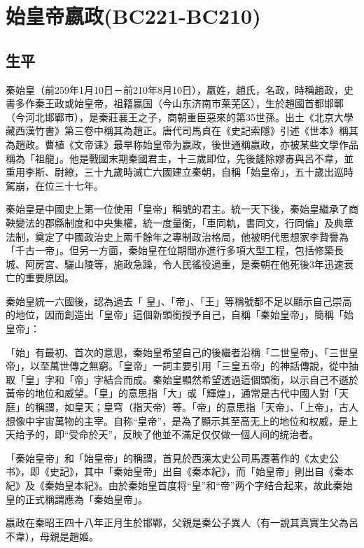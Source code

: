 
\section{始皇帝嬴政\tiny(BC221-BC210)}

\subsection{生平}


秦始皇（前259年1月10日－前210年8月10日），嬴姓，趙氏，名政，時稱趙政，史書多作秦王政或始皇帝，祖籍嬴国（今山东济南市莱芜区），生於趙國首都邯鄲（今河北邯鄲市），是秦莊襄王之子，商朝重臣惡來的第35世孫。出土《北京大學藏西漢竹書》第三卷中稱其為趙正。唐代司馬貞在《史記索隱》引述《世本》稱其為趙政。曹植《文帝诔》最早称始皇帝为嬴政，後世通稱嬴政，亦被某些文學作品稱為「祖龍」。他是戰國末期秦國君主，十三歲即位，先後鏟除嫪毐與呂不韋，並重用李斯、尉繚，三十九歲時滅亡六國建立秦朝，自稱「始皇帝」，五十歲出巡時駕崩，在位三十七年。

秦始皇是中國史上第一位使用「皇帝」稱號的君主。統一天下後，秦始皇繼承了商鞅變法的郡縣制度和中央集權，統一度量衡，「車同軌，書同文，行同倫」及典章法制，奠定了中國政治史上兩千餘年之專制政治格局，他被明代思想家李贄譽為「千古一帝」。但另一方面，秦始皇在位期間亦進行多項大型工程，包括修築長城、阿房宮、驪山陵等，施政急躁，令人民徭役過重，是秦朝在他死後3年迅速衰亡的重要原因。

秦始皇統一六國後，認為過去「 皇」、「帝」、「王」等稱號都不足以顯示自己崇高的地位，因而創造出「皇帝」這個新頭銜授予自己，自稱「秦始皇帝」，簡稱「始皇帝」：

「始」有最初、首次的意思，秦始皇希望自己的後繼者沿稱「二世皇帝」、「三世皇帝」，以至萬世傳之無窮。「皇帝」一詞主要引用「三皇五帝」的神話傳說，從中抽取「皇」字和「帝」字結合而成。秦始皇顯然希望透過這個頭銜，以示自己不遜於黃帝的地位和威望。「皇」的意思指「大」或「輝煌」，通常是古代中國人對「天庭」的稱謂，如皇天；皇穹（指天帝）等。「帝」的意思指「天帝」、「上帝」，古人想像中宇宙萬物的主宰。自称“皇帝”，是為了顯示其至高无上的地位和权威，是上天给予的，即“受命於天”，反映了他並不滿足仅仅做一個人间的统治者。

「秦始皇帝」和「始皇帝」的稱謂，首見於西漢太史公司馬遷著作的《太史公书》，即《史記》，其中「秦始皇帝」出自《秦本紀》，而「始皇帝」則出自《秦本紀》及《秦始皇本紀》。由於秦始皇首度将“皇”和“帝”两个字结合起来，故此秦始皇的正式稱謂應為「秦始皇帝」。

嬴政在秦昭王四十八年正月生於邯鄲，父親是秦公子異人（有一說其真實生父為呂不韋），母親是趙姬。

